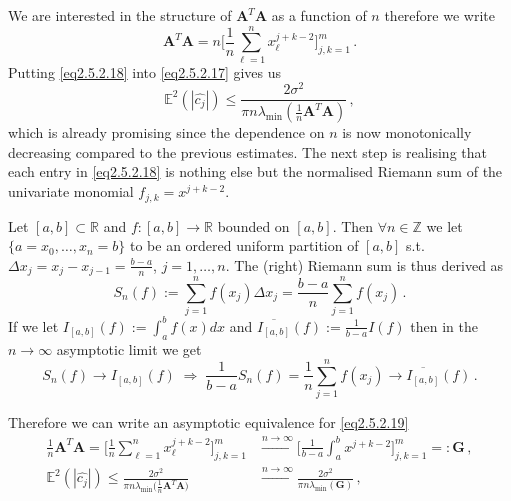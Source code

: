 \documentclass[../main.tex]{subfiles}
\begin{document}
We are interested in the structure of $\boldsymbol{A}^{T}\boldsymbol{A}$ as a function of $n$ therefore we write
\begin{equation}\label{eq2.5.2.18}
     \boldsymbol{A}^{T}\boldsymbol{A} = n\Bigg[\frac{1}{n}\sum_{\ell=1}^{n}x_{\ell}^{j+k-2}\Bigg]_{j,k=1}^{m}\,.
\end{equation}
Putting \eqref{eq2.5.2.18} into \eqref{eq2.5.2.17} gives us
\begin{equation}\label{eq2.5.2.19}
     \mathbb{E}^{2}(|\hat{c_{j}}|)\leq\frac{2\sigma^{2}}{\pi n\lambda_{\text{min}}(\frac{1}{n}\boldsymbol{A}^{T}\boldsymbol{A})}\,,
\end{equation}
which is already promising since the dependence on $n$ is now monotonically decreasing compared to the previous estimates.
The next step is realising that each entry in \eqref{eq2.5.2.18} is nothing else but the normalised Riemann sum of the univariate monomial $f_{j,k} = x^{j+k-2}$.
\begin{interpretation*}{}
        Let $[a,b]\subset \mathbb{R}$ and $f:[a,b]\to \mathbb{R}$ bounded on $[a,b]$. 
        Then $\forall n\in \mathbb{Z}$ we let $\{a = x_{0},\dots,x_{n}=b\}$ to be an ordered uniform partition of $[a,b]$ s.t. $\Delta x_{j}=x_{j}-x_{j-1}=\frac{b-a}{n}$, $j=1,\dots,n$.
        The (right) Riemann sum is thus derived as
        \begin{equation*}
             S_{n}(f):=\sum_{j=1}^{n}f(x_{j})\Delta x_{j} = \frac{b-a}{n}\sum_{j=1}^{n}f(x_{j})\,.
        \end{equation*}
        If we let $I_{[a,b]}(f):=\int_{a}^{b}f(x)dx$ and $\overline{I_{[a,b]}}(f):=\frac{1}{b-a}I(f)$ then in the $n\to\infty$ asymptotic limit we get
        \begin{equation*}
                S_{n}(f)\to I_{[a,b]}(f)\;\Rightarrow\;\frac{1}{b-a}S_{n}(f)=\frac{1}{n}\sum_{j=1}^{n}f(x_{j})\to\overline{I_{[a,b]}}(f)\,.
        \end{equation*}
\end{interpretation*}
Therefore we can write an asymptotic equivalence for \eqref{eq2.5.2.19}
\begin{align}
        \frac{1}{n}\boldsymbol{A}^{T}\boldsymbol{A} = \Bigg[\frac{1}{n}\sum_{\ell=1}^{n}x_{\ell}^{j+k-2}\Bigg]_{j,k=1}^{m} &\xrightarrow {n\to\infty}\Bigg[\frac{1}{b-a}\int_{a}^{b}x^{j+k-2}\Bigg]_{j,k=1}^{m}=: \boldsymbol{G} \nonumber \,, \\
        \mathbb{E}^{2}(|\hat{c_{j}}|)\leq\frac{2\sigma^{2}}{\pi n\lambda_{\text{min}}\Big(\frac{1}{n}\boldsymbol{A}^{T}\boldsymbol{A}\Big)} &\xrightarrow{n\to\infty} \frac{2\sigma^{2}}{\pi n\lambda_{\text{min}}(\boldsymbol{G})}\,, \label{eq2.5.2.20}
\end{align}
\end{document}
